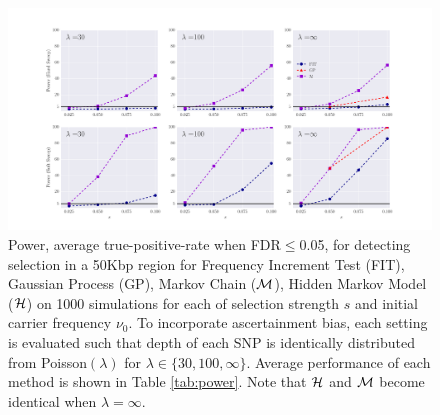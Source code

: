 \documentclass[11pt]{article}
\begin{document}
\begin{figure}[H]
	\centering
	\includegraphics[trim=0.4in 0 .8in 0.02in , clip,width=\textwidth]{figures/power.pdf}
	\caption{ Power, average
          true-positive-rate when FDR$\le$0.05, for detecting
          selection in a 50Kbp region for Frequency Increment Test
          (FIT), Gaussian Process (GP), Markov Chain (${\cal M}$), Hidden
          Markov Model (${\cal H}$) on 1000 simulations for each of
          selection strength $s$ and initial carrier frequency
          $\nu_0$. To incorporate ascertainment bias, each setting is
          evaluated such that depth of each SNP is identically
          distributed from Poisson$(\lambda)$ for $\lambda \in
          \{30,100,\infty\}$. Average performance of each method is
          shown in Table \ref{tab:power}. Note that ${\cal H}$ and ${\cal M}$
          become identical when $\lambda=\infty$.  } \label{fig:power}
\end{figure}
\end{document}
